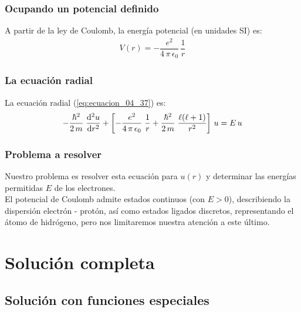 \documentclass[12pt]{beamer}
\begin{document}
\begin{frame}
\frametitle{Ocupando un potencial definido}
A partir de la ley de Coulomb, la energía potencial (en unidades SI) es:
\begin{align}
    V(r) = - \dfrac{e^{2}}{4 \, \pi \, \epsilon_{0}} \, \dfrac{1}{r}
\end{align}
\end{frame}
\begin{frame}
\frametitle{La ecuación radial}
La ecuación radial (\ref{eq:ecuacion_04_37}) es:
\begin{align}
    - \dfrac{\hbar^{2}}{2 \, m} \; \dv[2]{u}{r} + \left[ - \dfrac{e^{2}}{4 \, \pi \, \epsilon_{0}} \; \dfrac{1}{r} + \dfrac{\hbar^{2}}{2 \, m} \; \dfrac{\ell(\ell +1)}{r^{2}} \right] \, u =  E \, u
    \label{eq:ecuacion_04_53}
\end{align}
\end{frame}
\begin{frame}
\frametitle{Problema a resolver}
Nuestro problema es resolver esta ecuación para $u(r)$ y determinar las energías permitidas $E$ de los electrones. 
\\
\bigskip
\pause
El potencial de Coulomb admite estados continuos (con $E > 0$), describiendo la dispersión  electrón - protón, así como estados ligados discretos, representando el átomo de hidrógeno, pero nos limitaremos nuestra atención a este último.
\end{frame}

\section{Solución completa}
\subsection{Solución con funciones especiales}
\end{document}
